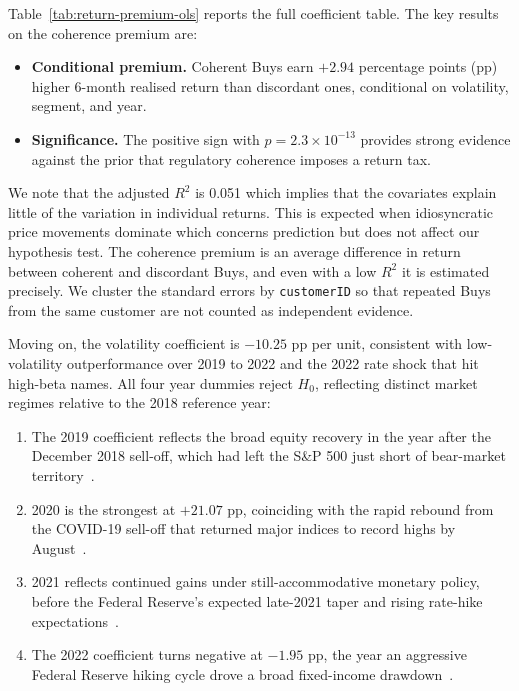 Table~\ref{tab:return-premium-ols} reports the full coefficient table. The key results on the coherence premium are:
\begin{itemize}
    \item \textbf{Conditional premium.} Coherent Buys earn $+2.94$ percentage points (pp) higher 6-month realised return than discordant ones, conditional on volatility, segment, and year.
    \item \textbf{Significance.} The positive sign with $p = 2.3 \times 10^{-13}$ provides strong evidence against the prior that regulatory coherence imposes a return tax.
\end{itemize}
We note that the adjusted $R^2$ is 0.051 which implies that the covariates explain little of the variation in individual returns. This is expected when idiosyncratic price movements dominate which concerns prediction but does not affect our hypothesis test. The coherence premium is an average difference in return between coherent and discordant Buys, and even with a low $R^2$ it is estimated precisely. We cluster the standard errors by \texttt{customerID} so that repeated Buys from the same customer are not counted as independent evidence.

Moving on, the volatility coefficient is $-10.25$ pp per unit, consistent with low-volatility outperformance over 2019 to 2022 and the 2022 rate shock that hit high-beta names. All four year dummies reject $H_0$, reflecting distinct market regimes relative to the 2018 reference year:

\begin{enumerate}
    \item The 2019 coefficient reflects the broad equity recovery in the year after the December 2018 sell-off, which had left the S\&P 500 just short of bear-market territory~\cite{cnbc2019stockmarket}.
    \item 2020 is the strongest at $+21.07$ pp, coinciding with the rapid rebound from the COVID-19 sell-off that returned major indices to record highs by August~\cite{reuters2020sp500recovery}.
    \item 2021 reflects continued gains under still-accommodative monetary policy, before the Federal Reserve's expected late-2021 taper and rising rate-hike expectations~\cite{reuters2021fedtaper}.
    \item The 2022 coefficient turns negative at $-1.95$ pp, the year an aggressive Federal Reserve hiking cycle drove a broad fixed-income drawdown~\cite{reuters2022marketwrap}.
\end{enumerate}


